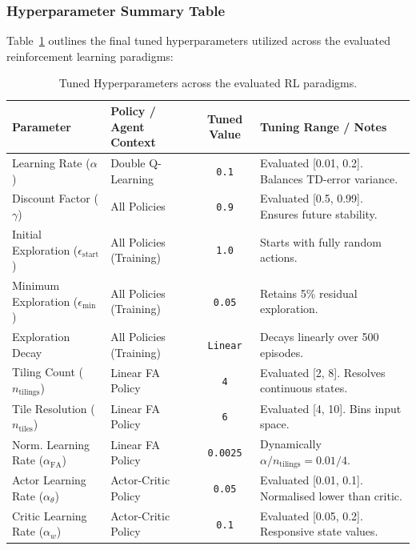 \documentclass[12pt,a4paper]{article}
\begin{document}
\subsubsection{Hyperparameter Summary Table}
Table~\ref{tab:hyperparameters_tex} outlines the final tuned hyperparameters utilized across the evaluated reinforcement learning paradigms:

\begin{table}[H]
    \centering
    \caption{Tuned Hyperparameters across the evaluated RL paradigms.}
    \label{tab:hyperparameters_tex}
    \begin{tabular}{llcl}
        \toprule
        \textbf{Parameter} & \textbf{Policy / Agent Context} & \textbf{Tuned Value} & \textbf{Tuning Range / Notes} \\
        \midrule
        Learning Rate ($\alpha$) & Double Q-Learning & \texttt{0.1} & Evaluated [0.01, 0.2]. Balances TD-error variance. \\
        Discount Factor ($\gamma$) & All Policies & \texttt{0.9} & Evaluated [0.5, 0.99]. Ensures future stability. \\
        Initial Exploration ($\epsilon_{\text{start}}$) & All Policies (Training) & \texttt{1.0} & Starts with fully random actions. \\
        Minimum Exploration ($\epsilon_{\text{min}}$) & All Policies (Training) & \texttt{0.05} & Retains 5\% residual exploration. \\
        Exploration Decay & All Policies (Training) & \texttt{Linear} & Decays linearly over 500 episodes. \\
        Tiling Count ($n_{\text{tilings}}$) & Linear FA Policy & \texttt{4} & Evaluated [2, 8]. Resolves continuous states. \\
        Tile Resolution ($n_{\text{tiles}}$) & Linear FA Policy & \texttt{6} & Evaluated [4, 10]. Bins input space. \\
        Norm. Learning Rate ($\alpha_{\text{FA}}$) & Linear FA Policy & \texttt{0.0025} & Dynamically $\alpha / n_{\text{tilings}} = 0.01 / 4$. \\
        Actor Learning Rate ($\alpha_{\theta}$) & Actor-Critic Policy & \texttt{0.05} & Evaluated [0.01, 0.1]. Normalised lower than critic. \\
        Critic Learning Rate ($\alpha_{w}$) & Actor-Critic Policy & \texttt{0.1} & Evaluated [0.05, 0.2]. Responsive state values. \\
        \bottomrule
    \end{tabular}
\end{table}
\end{document}
